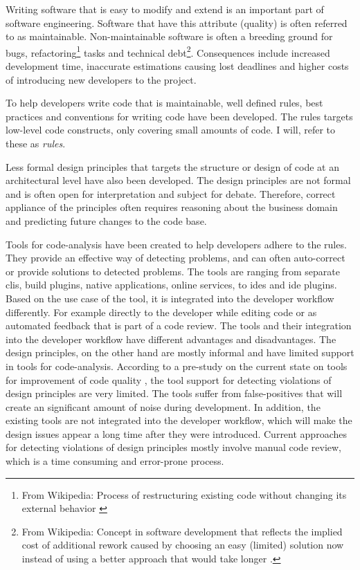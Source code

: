 \documentclass{report}
\begin{document}
Writing software that is easy to modify and extend is an important part of software engineering. Software that have this attribute (quality) is often referred to as maintainable. Non-maintainable software is often a breeding ground for bugs, refactoring\footnote{From Wikipedia: Process of restructuring existing code without changing its external behavior \cite{refactoring}} tasks and technical debt\footnote{From Wikipedia: Concept in software development that reflects the implied cost of additional rework caused by choosing an easy (limited) solution now instead of using a better approach that would take longer \cite{technicalDebt}.}. Consequences include increased development time, inaccurate estimations causing lost deadlines and higher costs of introducing new developers to the project.

To help developers write code that is maintainable, well defined rules, best practices and conventions for writing code have been developed. The rules targets low-level code constructs, only covering small amounts of code. I will, refer to these as \textit{rules}.

Less formal design principles that targets the structure or design of code at an architectural level have also been developed. The design principles are not formal and is often open for interpretation and subject for debate. Therefore, correct appliance of the principles often requires reasoning about the business domain and predicting future changes to the code base. 

Tools for code-analysis have been created to help developers adhere to the rules. They provide an effective way of detecting problems, and can often auto-correct or provide solutions to detected problems. The tools are ranging from separate \gls{cli}s, build plugins, native applications, online services, to \gls{ide}s and \gls{ide} plugins. Based on the use case of the tool, it is integrated into the developer workflow differently. For example directly to the developer while editing code or as automated feedback that is part of a code review.  The tools and their integration into the developer workflow have different advantages and disadvantages.
The design principles, on the other hand are mostly informal and have limited support in tools for code-analysis. According to a pre-study on the current state on tools for improvement of code quality \cite{prestudy}, the tool support for detecting violations of design principles are very limited. The tools suffer from false-positives that will create an significant amount of noise during development. In addition, the existing tools are not integrated into the developer workflow, which will make the design issues appear a long time after they were introduced. Current approaches for detecting violations of design principles mostly involve manual code review, which is a time consuming and error-prone process.
\end{document}
